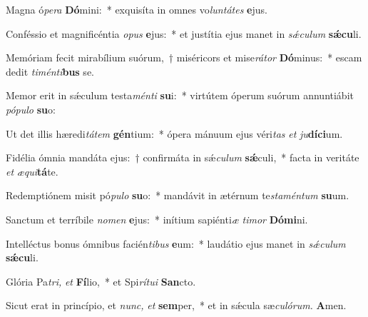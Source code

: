 \item Magna ó\textit{pera} \textbf{Dó}mini:~* exquisíta in omnes vo\teenyhspace\textit{luntátes} \textbf{e}jus.
\item Conféssio et magnificéntia \textit{opus} \textbf{e}jus:~* et justítia ejus manet in \textit{sǽculum} \textbf{sǽ}\textbf{cu}li.
\item Memóriam fecit mirabílium suórum,~† miséricors et mise\textit{rátor} \textbf{Dó}minus:~* escam dedit \textit{timénti}\textbf{bus} se.
\item Memor erit in sǽculum testa\textit{ménti} \textbf{su}i:~* virtútem óperum suórum annuntiábit \textit{pópulo} \textbf{su}o:
\item Ut det illis hæredi\textit{tátem} \textbf{gén}tium:~* ópera mánuum ejus véri\textit{tas} \textit{et} \textit{ju}\textbf{dí}\textbf{ci}um.
\item Fidélia ómnia mandáta ejus:~† confirmáta in sǽ\tinyhspace\textit{culum} \textbf{sǽ}culi,~* facta in veritáte \textit{et} \textit{æqui}\textbf{tá}te.
\item Redemptiónem misit pó\textit{pulo} \textbf{su}o:~* mandávit in ætérnum te\tinyhspace\textit{staméntum} \textbf{su}um.
\item Sanctum et terríbile \textit{nomen} \textbf{e}jus:~* inítium sapiénti\tinyhspace\textit{æ} \textit{timor} \textbf{Dó}\textbf{mi}ni.
\item Intelléctus bonus ómnibus facién\textit{tibus} \textbf{e}um:~* laudátio ejus manet in \textit{sǽculum} \textbf{sǽ}\textbf{cu}li.
\item Glória Pa\tinyhspace\textit{tri,} \textit{et} \textbf{Fí}lio,~* et Spi\teenyhspace\textit{rítui} \textbf{San}cto.
\item Sicut erat in princípio, et \textit{nunc,} \textit{et} \textbf{sem}per,~* et in sǽcula sæ\tinyhspace\textit{culórum.} \textbf{A}men.